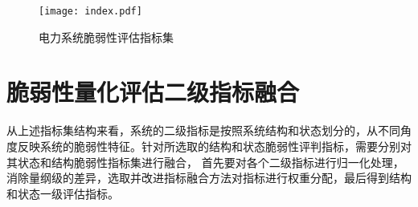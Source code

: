 \begin{figure}[H] %
    \centering
    \texttt{[image: index.pdf]}
    \caption{电力系统脆弱性评估指标集}
    \label{fig:index}
  \end{figure}



\section{脆弱性量化评估二级指标融合}
\label{sec:processIndex}
从上述指标集结构来看，系统的二级指标是按照系统结构和状态划分的，从不同角度反映系统的脆弱性特征。针对所选取的结构和状态脆弱性评判指标，需要分别对其状态和结构脆弱性指标集进行融合，
首先要对各个二级指标进行归一化处理，消除量纲级的差异，选取并改进指标融合方法对指标进行权重分配，最后得到结构和状态一级评估指标。


